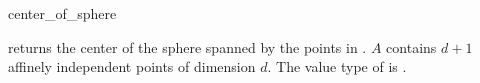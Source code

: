 \begin{ccRefFunction}{center_of_sphere}
\ccHtmlNoLinks

{returns the center of the sphere spanned by the points in \ccc{A =
    tuple[first,last)}.  \ccPrecond $A$ contains $d+1$ affinely
  independent points of dimension $d$.  \ccRequire The value type of
   is .}

\end{ccRefFunction}

